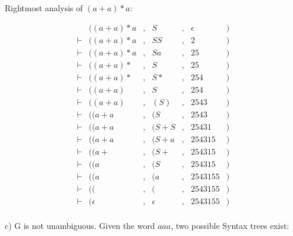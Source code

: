 Rightmost analysis of $(a + a)*a$:

\begin{equation*}
  \begin{aligned}
          & ((a + a)*a&, &S&, &\epsilon &) \\
 \vdash   & ((a + a)*a&,  &SS&, &2 &) \\
 \vdash   & ((a + a)*a&,  &Sa&, &25 &) \\
 \vdash   & ((a + a)*&,  &S&, &25 &) \\
 \vdash   & ((a + a)*&,  &S*&, &254 &) \\
 \vdash   & ((a + a)&,  &S&, &254 &) \\
 \vdash   & ((a + a)&,  &(S)&, &2543 &) \\
 \vdash   & ((a + a&,  &(S&, &2543 &) \\
 \vdash   & ((a + a&,  &(S+S&, &25431 &) \\
 \vdash   & ((a + a&,  &(S+a&, &254315 &) \\
 \vdash   & ((a +&,  &(S+&, &254315 &) \\
 \vdash   & ((a&,  &(S&, &254315 &) \\
 \vdash   & ((a&,  &(a&, &2543155 &) \\
 \vdash   & ((&,  &(&, &2543155 &) \\
 \vdash   & (\epsilon&,  & \epsilon&, &2543155&) \\
\end{aligned}
\end{equation*}

c) G is not unambiguous. Given the word $aaa$, two possible Syntax trees exist:

